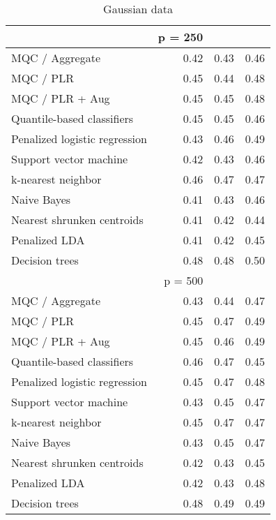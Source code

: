 \begin{table}[p]
\begin{minipage}{0.49\textwidth}
{\begin{tabular}{lrrr}
        \hline
        & p = 250 \\
        \hline

        MQC / Aggregate & 0.42 & 0.43 & 0.46 \\ 
        MQC / PLR & 0.45 & 0.44 & 0.48 \\ 
        MQC / PLR + Aug & 0.45 & 0.45 & 0.48 \\ 
        Quantile-based classifiers & 0.45 & 0.45 & 0.46 \\ 
        Penalized logistic regression & 0.43 & 0.46 & 0.49 \\ 
        Support vector machine & 0.42 & 0.43 & 0.46 \\ 
        k-nearest neighbor & 0.46 & 0.47 & 0.47 \\ 
        Naive Bayes & 0.41 & 0.43 & 0.46 \\ 
        Nearest shrunken centroids & 0.41 & 0.42 & 0.44 \\ 
        Penalized LDA & 0.41 & 0.42 & 0.45 \\ 
        Decision trees & 0.48 & 0.48 & 0.50 \\[2ex]

        \hline
        & p = 500 \\
        \hline

        MQC / Aggregate & 0.43 & 0.44 & 0.47 \\ 
        MQC / PLR & 0.45 & 0.47 & 0.49 \\ 
        MQC / PLR + Aug & 0.45 & 0.46 & 0.49 \\ 
        Quantile-based classifiers & 0.46 & 0.47 & 0.45 \\ 
        Penalized logistic regression & 0.45 & 0.47 & 0.48 \\ 
        Support vector machine & 0.43 & 0.45 & 0.47 \\ 
        k-nearest neighbor & 0.45 & 0.47 & 0.47 \\ 
        Naive Bayes & 0.43 & 0.45 & 0.47 \\ 
        Nearest shrunken centroids & 0.42 & 0.43 & 0.45 \\ 
        Penalized LDA & 0.42 & 0.43 & 0.48 \\ 
        Decision trees & 0.48 & 0.49 & 0.49 \\ 
        \hline
      \end{tabular}
    }
  \end{minipage}
  \caption{Gaussian data}
\end{table}





